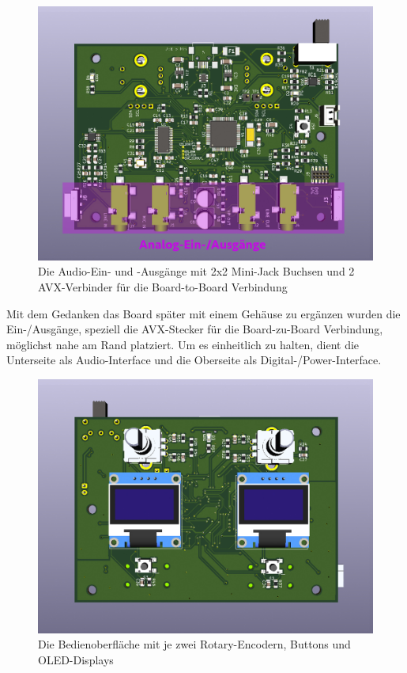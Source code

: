 \begin{figure} [H]
\begin{center}
 \includegraphics[scale=0.37]{../graphics/PCB-Layout_INOUT.jpg}
 \caption{Die Audio-Ein- und -Ausgänge mit 2x2 Mini-Jack Buchsen und 2 AVX-Verbinder für die Board-to-Board Verbindung}
\label{fig:PCB_INOUT}
\end{center}
\end{figure}

Mit dem Gedanken das Board später mit einem Gehäuse zu ergänzen wurden die Ein-/Ausgänge, speziell die AVX-Stecker für die Board-zu-Board Verbindung, möglichst nahe am Rand platziert. Um es einheitlich zu halten, dient die Unterseite als Audio-Interface und die Oberseite als Digital-/Power-Interface. 

\begin{figure} [H]
\begin{center}
 \includegraphics[scale=0.37]{../graphics/PCB-Layout_GUI.jpg}
 \caption{Die Bedienoberfläche mit je zwei Rotary-Encodern, Buttons und OLED-Displays}
\label{fig:PCB_GUI}
\end{center}
\end{figure}

